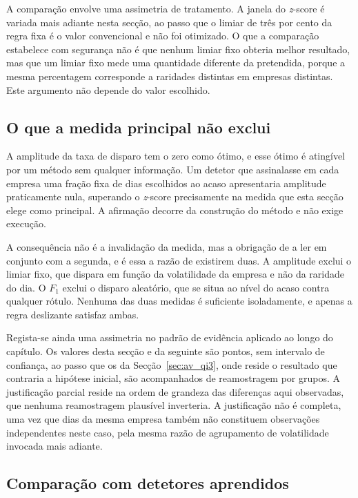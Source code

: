 A comparação envolve uma assimetria de tratamento. A janela do \emph{z}-score é variada mais adiante
nesta secção, ao passo que o limiar de três por cento da regra fixa é o valor convencional e não foi
otimizado. O que a comparação estabelece com segurança não é que nenhum limiar fixo obteria melhor
resultado, mas que um limiar fixo mede uma quantidade diferente da pretendida, porque a mesma
percentagem corresponde a raridades distintas em empresas distintas. Este argumento não depende do
valor escolhido.

\subsection{O que a medida principal não exclui}

A amplitude da taxa de disparo tem o zero como ótimo, e esse ótimo é atingível por um método sem
qualquer informação. Um detetor que assinalasse em cada empresa uma fração fixa de dias escolhidos
ao acaso apresentaria amplitude praticamente nula, superando o \emph{z}-score precisamente na medida
que esta secção elege como principal. A afirmação decorre da construção do método e não exige
execução.

A consequência não é a invalidação da medida, mas a obrigação de a ler em conjunto com a segunda, e
é essa a razão de existirem duas. A amplitude exclui o limiar fixo, que dispara em função da
volatilidade da empresa e não da raridade do dia. O $F_1$ exclui o disparo aleatório, que se situa
ao nível do acaso contra qualquer rótulo. Nenhuma das duas medidas é suficiente isoladamente, e
apenas a regra deslizante satisfaz ambas.


Regista-se ainda uma assimetria no padrão de evidência aplicado ao longo do capítulo. Os valores
desta secção e da seguinte são pontos, sem intervalo de confiança, ao passo que os da
Secção~\ref{sec:av_qi3}, onde reside o resultado que contraria a hipótese inicial, são acompanhados
de reamostragem por grupos. A justificação parcial reside na ordem de grandeza das diferenças aqui
observadas, que nenhuma reamostragem plausível inverteria. A justificação não é completa, uma vez
que dias da mesma empresa também não constituem observações independentes neste caso, pela mesma
razão de agrupamento de volatilidade invocada mais adiante.

\subsection{Comparação com detetores aprendidos}


